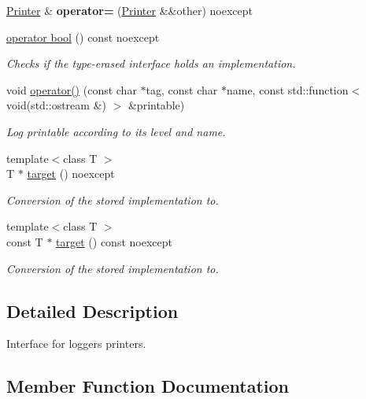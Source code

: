 \begin{DoxyCompactItemize}
\item 
\hyperlink{classSpacy_1_1Log_1_1Printer}{Printer} \& {\bfseries operator=} (\hyperlink{classSpacy_1_1Log_1_1Printer}{Printer} \&\&other) noexcept\hypertarget{classSpacy_1_1Log_1_1Printer_ade7cb7bb9d3a2d530186aedb06fbbe59}{}\label{classSpacy_1_1Log_1_1Printer_ade7cb7bb9d3a2d530186aedb06fbbe59}

\item 
\hyperlink{classSpacy_1_1Log_1_1Printer_ae46d1fd573983c31df0f90638120c378}{operator bool} () const noexcept
\begin{DoxyCompactList}\small\item\em Checks if the type-\/erased interface holds an implementation. \end{DoxyCompactList}\item 
void \hyperlink{classSpacy_1_1Log_1_1Printer_aeea78f7dde3f0da8e5bdc9b1298d58b3}{operator()} (const char $\ast$tag, const char $\ast$name, const std\+::function$<$ void(std\+::ostream \&) $>$ \&printable)
\begin{DoxyCompactList}\small\item\em Log printable according to its level and name. \end{DoxyCompactList}\item 
{\footnotesize template$<$class T $>$ }\\T $\ast$ \hyperlink{classSpacy_1_1Log_1_1Printer_ab109ed757887ac804faa40de8acf00c0}{target} () noexcept
\begin{DoxyCompactList}\small\item\em Conversion of the stored implementation to. \end{DoxyCompactList}\item 
{\footnotesize template$<$class T $>$ }\\const T $\ast$ \hyperlink{classSpacy_1_1Log_1_1Printer_ab909a33cd790ca1c4554d89322605a27}{target} () const noexcept
\begin{DoxyCompactList}\small\item\em Conversion of the stored implementation to. \end{DoxyCompactList}\end{DoxyCompactItemize}


\subsection{Detailed Description}
Interface for logger\textquotesingle{}s printers. 

\subsection{Member Function Documentation}
